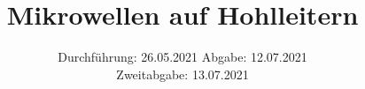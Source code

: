 

\subject{V53}
\title{Mikrowellen auf Hohlleitern}
\date{%
  Durchführung: 26.05.2021
  \hspace{3em}
  Abgabe: 12.07.2021\\
  \hspace{6.19cm} Zweitabgabe: 13.07.2021
}



\maketitle
\thispagestyle{empty}
\tableofcontents
\newpage








\printbibliography{}


